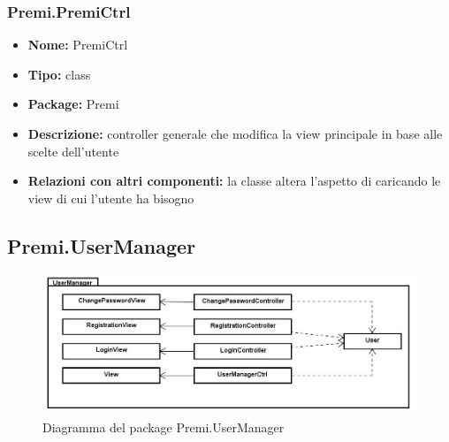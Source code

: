 \subsubsection{Premi.PremiCtrl}
\begin{itemize}
  \item \textbf{Nome:} PremiCtrl
  \item \textbf{Tipo:} class
  \item \textbf{Package:} Premi
  \item \textbf{Descrizione:} controller generale che modifica la view principale in base alle scelte dell'utente
  \item \textbf{Relazioni con altri componenti:} la classe altera l'aspetto di  caricando le view di cui l'utente ha bisogno 
\end{itemize}

\subsection{Premi.UserManager}
\begin{figure}[h]
\begin{center}
\includegraphics[scale=0.45]{img/diapkg/vecchi/usermanager-class.jpg}
\caption{Diagramma del package Premi.UserManager}
\end{center}
\end{figure}
\clearpage
